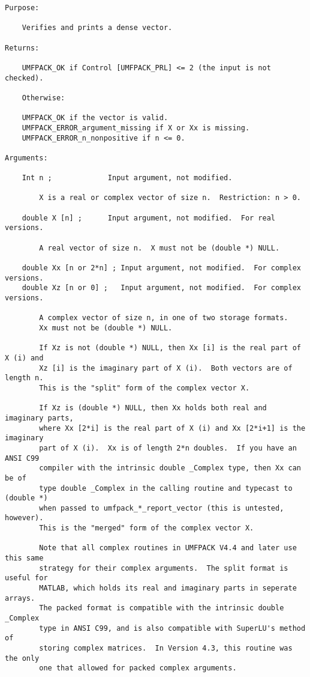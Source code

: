 \documentclass[11pt]{article}
\begin{document}
{\begin{verbatim}
Purpose:

    Verifies and prints a dense vector.

Returns:

    UMFPACK_OK if Control [UMFPACK_PRL] <= 2 (the input is not checked).

    Otherwise:

    UMFPACK_OK if the vector is valid.
    UMFPACK_ERROR_argument_missing if X or Xx is missing.
    UMFPACK_ERROR_n_nonpositive if n <= 0.

Arguments:

    Int n ;             Input argument, not modified.

        X is a real or complex vector of size n.  Restriction: n > 0.

    double X [n] ;      Input argument, not modified.  For real versions.

        A real vector of size n.  X must not be (double *) NULL.

    double Xx [n or 2*n] ; Input argument, not modified.  For complex versions.
    double Xz [n or 0] ;   Input argument, not modified.  For complex versions.

        A complex vector of size n, in one of two storage formats.
        Xx must not be (double *) NULL.

        If Xz is not (double *) NULL, then Xx [i] is the real part of X (i) and
        Xz [i] is the imaginary part of X (i).  Both vectors are of length n.
        This is the "split" form of the complex vector X.

        If Xz is (double *) NULL, then Xx holds both real and imaginary parts,
        where Xx [2*i] is the real part of X (i) and Xx [2*i+1] is the imaginary
        part of X (i).  Xx is of length 2*n doubles.  If you have an ANSI C99
        compiler with the intrinsic double _Complex type, then Xx can be of
        type double _Complex in the calling routine and typecast to (double *)
        when passed to umfpack_*_report_vector (this is untested, however).
        This is the "merged" form of the complex vector X.

        Note that all complex routines in UMFPACK V4.4 and later use this same
        strategy for their complex arguments.  The split format is useful for
        MATLAB, which holds its real and imaginary parts in seperate arrays.
        The packed format is compatible with the intrinsic double _Complex
        type in ANSI C99, and is also compatible with SuperLU's method of
        storing complex matrices.  In Version 4.3, this routine was the only
        one that allowed for packed complex arguments.


\end{verbatim}}
\end{document}
